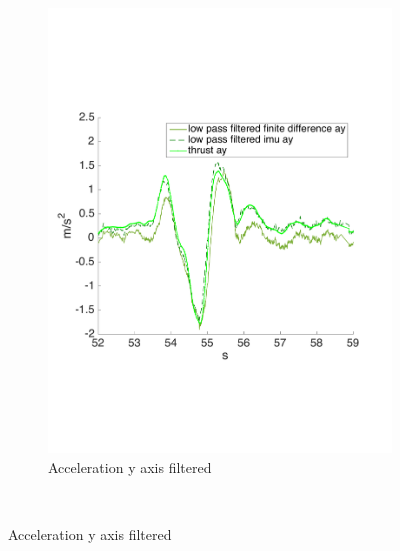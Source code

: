 \begin{figure}[!htbp]
\begin{subfigure}[b]{0.45\textwidth}
     \includegraphics[width=\textwidth]{img/acceleration_mass_changed_filtered_y.pdf}
        \caption{Acceleration y axis filtered}
        \label{fig:comparison_accy_fil}
   \end{subfigure}\\[20pt]
   

\end{figure}
